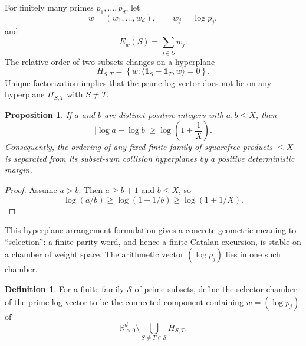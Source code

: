 \documentclass[11pt]{amsart}
\numberwithin{equation}{section}
\theoremstyle{plain}
\newtheorem{proposition}[theorem]{Proposition}
\theoremstyle{definition}
\newtheorem{definition}[theorem]{Definition}
\theoremstyle{remark}
\newcommand{\R}{\mathbb{R}}
\begin{document}
For finitely many primes $p_1,\ldots,p_d$, let
\begin{equation}
w=(w_1,\ldots,w_d),
\qquad
w_j=\log p_j,
\label{eq:prime_weight_vector}
\end{equation}
and
\begin{equation}
E_w(S)=\sum_{j\in S}w_j.
\label{eq:weighted_subset_energy}
\end{equation}
The relative order of two subsets changes on a hyperplane
\begin{equation}
H_{S,T}
=
\left\{w:\langle \mathbf{1}_S-\mathbf{1}_T,w\rangle=0\right\}.
\label{eq:subset_order_hyperplane}
\end{equation}
Unique factorization implies that the prime-log vector does not lie on any hyperplane $H_{S,T}$ with $S\ne T$.

\begin{proposition}
\label{prop:subset_gap}
If $a$ and $b$ are distinct positive integers with $a,b\le X$, then
\begin{equation}
|\log a-\log b|
\ge
\log\!\left(1+\frac{1}{X}\right).
\label{eq:log_integer_gap}
\end{equation}
Consequently, the ordering of any fixed finite family of squarefree products $\le X$ is separated from its subset-sum collision hyperplanes by a positive deterministic margin.
\end{proposition}

\begin{proof}
Assume $a>b$.  Then $a\ge b+1$ and $b\le X$, so
\begin{equation}
\log(a/b)
\ge
\log(1+1/b)
\ge
\log(1+1/X).
\label{eq:log_gap_proof}
\end{equation}
\end{proof}

This hyperplane-arrangement formulation gives a concrete geometric meaning to ``selection'': a finite parity word, and hence a finite Catalan excursion, is stable on a chamber of weight space.  The arithmetic vector $(\log p_j)$ lies in one such chamber.

\begin{definition}
\label{def:selector_chamber}
For a finite family $\mathcal S$ of prime subsets, define the selector chamber of the prime-log vector to be the connected component containing $w=(\log p_j)$ of
\begin{equation}
\R_{>0}^{d}
\setminus
\bigcup_{S\ne T\in\mathcal S}H_{S,T}.
\label{eq:selector_chamber_definition}
\end{equation}
\end{definition}
\end{document}
